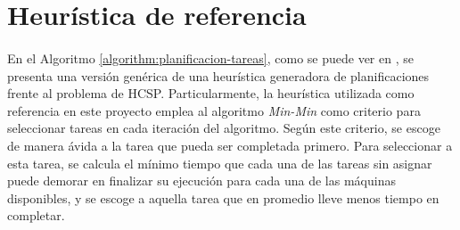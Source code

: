 \centerline{
}

\section{Heurística de referencia} \label{section:descripcion-problema,subsection:heuristica}
 
\paragraph{}En el Algoritmo \ref{algorithm:planificacion-tareas}, como se puede ver en \citet{bib-doctorado-nesmachnow}, se presenta una versión genérica de una heurística generadora de planificaciones frente al problema de HCSP.
Particularmente, la heurística utilizada como referencia en este proyecto emplea al algoritmo \textit{Min-Min} como criterio para seleccionar tareas en cada iteración del algoritmo.
Según este criterio, se escoge de manera ávida a la tarea que pueda ser completada primero.
Para seleccionar a esta tarea, se calcula el mínimo tiempo que cada una de las tareas sin asignar puede demorar en finalizar su ejecución para cada una de las máquinas disponibles, y se escoge a aquella tarea que en promedio lleve menos tiempo en completar.

